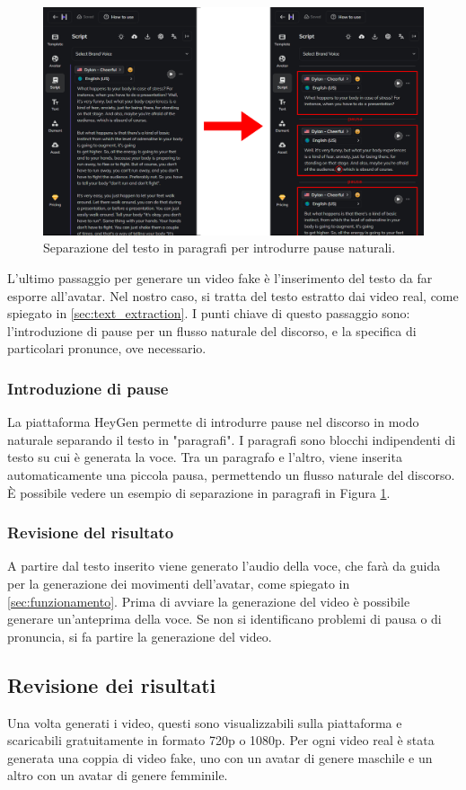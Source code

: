 \begin{figure}[t]
    \centering
    \includegraphics[width=0.9\linewidth]{images/text_heygen}
    \caption{Separazione del testo in paragrafi per introdurre pause naturali.}
    \label{fig:text_heygen}
\end{figure}

L'ultimo passaggio per generare un video fake è l'inserimento del testo da far esporre all'avatar. Nel nostro caso, si tratta del testo estratto dai video real, come spiegato in \ref{sec:text_extraction}. 
I punti chiave di questo passaggio sono: l'introduzione di pause per un flusso naturale del discorso, e la specifica di particolari pronunce, ove necessario.

\subsubsection{Introduzione di pause}

La piattaforma HeyGen permette di introdurre pause nel discorso in modo naturale separando il testo in "paragrafi". I paragrafi sono blocchi indipendenti di testo su cui è generata la voce. Tra un paragrafo e l'altro, viene inserita automaticamente una piccola pausa, permettendo un flusso naturale del discorso. È possibile vedere un esempio di separazione in paragrafi in Figura \ref{fig:text_heygen}.

\subsubsection{Revisione del risultato}

A partire dal testo inserito viene generato l'audio della voce, che farà da guida per la generazione dei movimenti dell'avatar, come spiegato in \ref{sec:funzionamento}. Prima di avviare la generazione del video è possibile generare un'anteprima della voce. Se non si identificano problemi di pausa o di pronuncia, si fa partire la generazione del video.

\subsection{Revisione dei risultati}

Una volta generati i video, questi sono visualizzabili sulla piattaforma e scaricabili gratuitamente in formato 720p o 1080p. Per ogni video real è stata generata una coppia di video fake, uno con un avatar di genere maschile e un altro con un avatar di genere femminile.

\clearpage